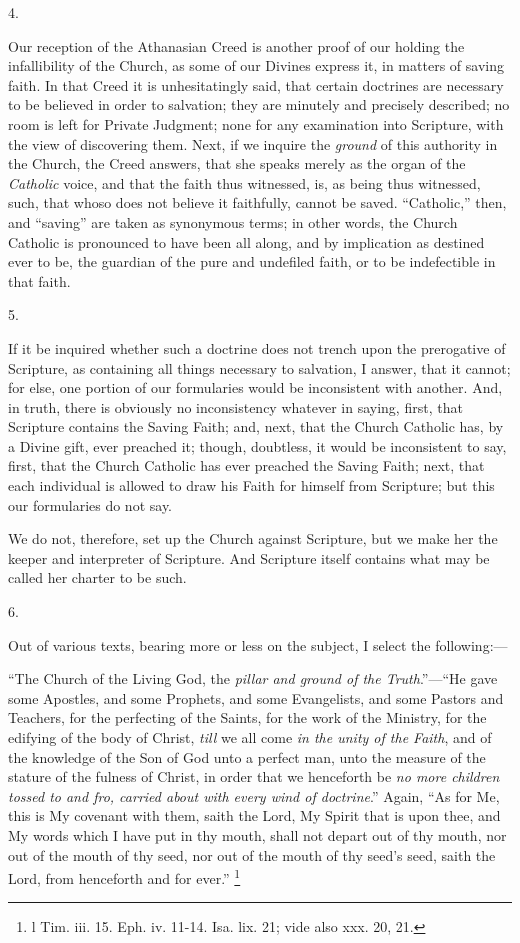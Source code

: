 4.

Our reception of the Athanasian Creed is another proof of our
holding the infallibility of the Church, as some of our Divines
express it, in matters of saving faith. In that Creed it is
unhesitatingly said, that certain doctrines are necessary to be
believed in order to salvation; they are minutely and precisely
described; no room is left for Private Judgment; none for any
examination into Scripture, with the view of discovering them. Next,
if we inquire the \emph{ground} of this authority in the Church, the
Creed answers, that she speaks merely as the organ of the \emph{Catholic}
voice, and that the faith thus witnessed, is, as being thus witnessed,
such, that whoso does not believe it faithfully, cannot be saved.
``Catholic,'' then, and ``saving'' are taken as
synonymous terms; in other words, the Church Catholic is pronounced to
have been all along, and by implication as destined ever to be, the
guardian of the pure and undefiled faith, or to be indefectible in
that faith.

5.

If it be inquired whether such a doctrine does not trench upon the
prerogative of Scripture, as containing all things necessary to
salvation, I answer, that it cannot; for else, one portion of our
formularies would be inconsistent with another. And, in truth, there
is obviously no inconsistency whatever in saying, first, that
Scripture contains the Saving Faith; and, next, that the Church
Catholic has, by a Divine gift, ever preached it; though, doubtless,
it would be inconsistent to say, first, that the Church Catholic has
ever preached the Saving Faith; next, that each individual is allowed
to draw his Faith for himself from Scripture; but this our formularies
do not say.

We do not, therefore, set up the Church against Scripture, but we
make her the keeper and interpreter of Scripture. And Scripture
itself contains what may be called her charter to be such.

6.

Out of various texts, bearing more or less on the subject, I select
the following:—

``The Church of the Living God, the \emph{pillar and ground of the
Truth}.''—``He gave some Apostles, and some Prophets, and
some Evangelists, and some Pastors and Teachers, for the perfecting of
the Saints, for the work of the Ministry, for the edifying of the body
of Christ, \emph{till} we all come \emph{in the unity of the Faith},
and of the knowledge of the Son of God unto a perfect man, unto the
measure of the stature of the fulness of Christ, in order that we
henceforth be \emph{no more children tossed to and fro, carried about
with every wind of doctrine}.'' Again, ``As for Me, this is
My covenant with them, saith the Lord, My Spirit that is upon thee,
and My words which I have put in thy mouth, shall not depart out of
thy mouth, nor out of the mouth of thy seed, nor out of the mouth of
thy seed's seed, saith the Lord, from henceforth and for ever.'' \footnote{l Tim. iii. 15. Eph. iv. 11-14. Isa. lix.
21; vide also xxx. 20, 21.}

